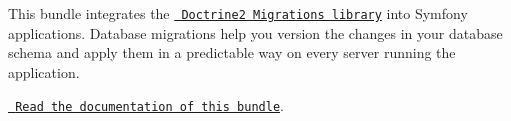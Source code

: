 This bundle integrates the \href{http://www.doctrine-project.org/projects/migrations.html}{\texttt{ Doctrine2 Migrations library}} into Symfony applications. Database migrations help you version the changes in your database schema and apply them in a predictable way on every server running the application.

\href{https://symfony.com/doc/current/bundles/DoctrineMigrationsBundle/index.html}{\texttt{ Read the documentation of this bundle}}. 